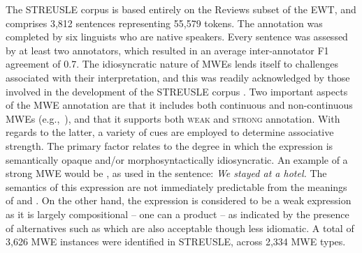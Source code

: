 \documentclass[output=paper,modfonts,nonflat]{langsci/langscibook}
\begin{document}
The STREUSLE corpus \citep{schneider2014} is based entirely on the Reviews subset of the EWT, and comprises 3,812 sentences representing 55,579 tokens. The annotation was completed by six linguists who are native  speakers. Every sentence was assessed by at least two annotators, which resulted in an average inter-annotator F1 agreement of 0.7. The idiosyncratic nature of MWEs lends itself to challenges associated with their interpretation, and this was readily acknowledged by those involved in the development of the STREUSLE corpus \citep{Hollenstein16}. Two important aspects of the MWE annotation are that it includes both continuous and non-continuous MWEs (e.g.,\ ), and that it supports both \textsc{weak} and \textsc{strong} annotation. With regards to the latter, a variety of cues are employed to determine associative strength. The primary factor relates to the degree in which the expression is semantically opaque and/or morphosyntactically idiosyncratic. An example of a strong MWE would be , as used in the sentence: \textit{We stayed at a  hotel.} The semantics of this expression are not immediately predictable from the meanings of  and . On the other hand, the expression  is considered to be a weak expression as it is largely compositional -- one can  a product -- as indicated by the presence of alternatives such as  which are also acceptable though less idiomatic. A total of 3,626 MWE instances were identified in STREUSLE, across 2,334 MWE types.

\end{document}
